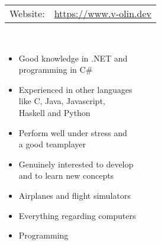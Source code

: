 \documentclass[11pt,oneside,a4paper,titlepage]{article}
\begin{document}
\begin{tcolorbox}
\begin{minipage}[t]{8cm}
\begin{tcolorbox}[grow to left by=15pt,colframe=sup-lgray,colback=sup-lgray,sharp corners]
{\begin{tabular}{l l}
                    Website: & \href{https://www.v-olin.dev}{https://www.v-olin.dev} \\
                \end{tabular} \\
                \begin{itemize}
                    \item{Good knowledge in .NET and\\programming in C\#}
                    \item{Experienced in other languages\\like C, Java, Javascript,\\Haskell and Python}
                    \item{Perform well under stress and\\a good teamplayer} %
                    \item{Genuinely interested to develop\\ and to learn new concepts}%
                    \vspace*{10pt}
                \end{itemize}
                \begin{itemize}
                    \item{Airplanes and flight simulators}
                    \item{Everything regarding computers}
                    \item{Programming\\\\\\\\\\\\}
                \end{itemize}
            }            
        \end{tcolorbox}
    \end{minipage}
    \begin{minipage}[t]{12cm}
        \vspace*{-18.2pt}
        \begin{tcolorbox}[grow to left by=-10pt,colframe=white,colback=white,sharp corners]

\end{tcolorbox}
\end{minipage}
\end{tcolorbox}
\end{document}
